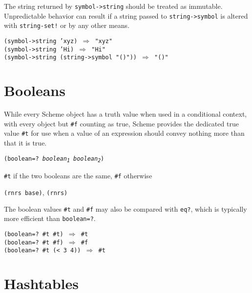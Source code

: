 The string returned by \texttt{symbol-\textgreater{}string} should be treated as
immutable.
Unpredictable behavior can result if a string passed to
\texttt{string-\textgreater{}symbol} is altered with
\texttt{string-set!} or by any other means.


\begin{alltt}
(symbol-\textgreater{}string 'xyz) \(\Rightarrow\) "xyz"
(symbol-\textgreater{}string 'Hi) \(\Rightarrow\) "Hi"
(symbol-\textgreater{}string (string-\textgreater{}symbol "()")) \(\Rightarrow\) "()"
\end{alltt}

\section{\label{objects_g118}\label{objects_h12}Booleans\label{objects_SECTMISCBOOLEANS}}



While every Scheme object has a truth value when used in a conditional
context, with every object but \texttt{\#{}f} counting as true,
Scheme provides the dedicated true value \texttt{\#{}t} for use when
a value of an expression should convey nothing more than that it is true.

\begin{description}

\label{objects_s271}\item[procedure] \texttt{(boolean=? \textit{boolean\textsubscript{1}} \textit{boolean\textsubscript{2}})}



\item[returns] \texttt{\#{}t} if the two booleans are the same, \texttt{\#{}f} otherwise


\item[libraries] \texttt{(rnrs base)}, \texttt{(rnrs)}
\end{description}


The boolean values \texttt{\#{}t} and \texttt{\#{}f} may also be compared with
\texttt{eq?}, which is typically more efficient than \texttt{boolean=?}.


\begin{alltt}
(boolean=? \#{}t \#{}t) \(\Rightarrow\) \#{}t
(boolean=? \#{}t \#{}f) \(\Rightarrow\) \#{}f
(boolean=? \#{}t (\textless{} 3 4)) \(\Rightarrow\) \#{}t
\end{alltt}

\section{\label{objects_g119}\label{objects_h13}Hashtables\label{objects_SECTHASHTABLES}}



